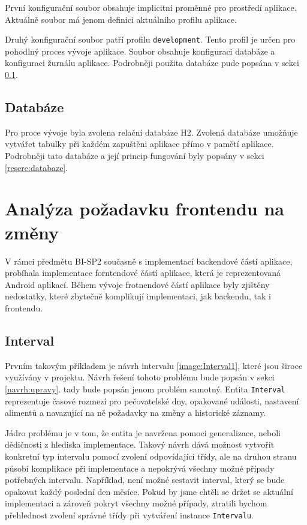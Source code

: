         První konfigurační soubor obsahuje implicitní proměnné pro prostředí aplikace. Aktuálně soubor má jenom definici aktuálního profilu aplikace. 
    
        Druhý konfigurační soubor patří profilu \texttt{development}. Tento profil je určen pro pohodlný proces vývoje aplikace. Soubor obsahuje konfiguraci databáze a konfiguraci žurnálu aplikace. Podrobněji použita databáze pude popsána v sekci \ref{analyza:soucasnaImplementace:databaze}.
        
    \subsection{Databáze}\label{analyza:soucasnaImplementace:databaze}
        Pro proce vývoje byla zvolena relační databáze H2. Zvolená databáze umožňuje vytvářet tabulky při každém zapuštěni aplikace přímo v pamětí aplikace. Podrobněji tato databáze a její princip fungování byly popsány v sekci \ref{resere:databaze}.
    
\section{Analýza požadavku frontendu na změny}\label{analyza:pozadavky-frontendu}
    V rámci předmětu BI-SP2 současně s implementací backendové částí aplikace, probíhala implementace forntendové částí aplikace, která je reprezentovaná Android aplikací. Během vývoje frotnendové částí aplikace byly zjištěny nedostatky, které zbytečně komplikují implementaci, jak backendu, tak i frontendu.
    
    \subsection{Interval}
        Prvním takovým příkladem je návrh intervalu \ref{image:Interval1}, které jsou široce využívány v projektu. Návrh řešení tohoto problému bude popsán v sekci \ref{navrh:upravy}. tady bude popsán jenom problém samotný. Entita \texttt{Interval} reprezentuje časové rozmezí pro pečovatelské dny, opakované události, nastavení alimentů a navazující na ně požadavky na změny a historické záznamy.
            
        Jádro problému je v tom, že entita je navržena pomoci generalizace, neboli dědičnosti z hlediska implementace. Takový návrh dává možnost vytvořit konkretní typ intervalu pomocí zvolení odpovídající třídy, ale na druhou stranu působí komplikace při implementace a nepokrývá všechny možné případy potřebných intervalu. Například, není možné sestavit interval, který se bude opakovat každý poslední den měsíce. Pokud by jsme chtěli se držet se aktuální implementaci a zároveň pokryt všechny možné případy, ztratili bychom přehlednost zvolení správné třídy při vytváření instance \texttt{Intervalu}.
            
